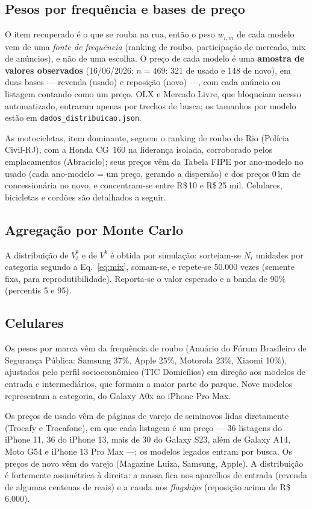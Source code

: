 \documentclass[11pt,a4paper]{article}
\newcommand{\reais}[1]{R\$\,#1}
\begin{document}
\subsection{Pesos por frequência e bases de preço}
O item recuperado é o que se rouba na rua, então o peso $w_{i,m}$ de cada modelo vem de uma
\emph{fonte de frequência} (ranking de roubo, participação de mercado, mix de anúncios), e não de
uma escolha. O preço de cada modelo é uma \textbf{amostra de valores observados} (16/06/2026;
$n=469$: 321 de usado e 148 de novo), em duas bases --- revenda (usado) e reposição (novo) ---, com
cada anúncio ou listagem contando como um preço. OLX e Mercado Livre, que bloqueiam acesso
automatizado, entraram apenas por trechos de busca; os tamanhos por modelo estão em
\texttt{dados\_distribuicao.json}.

As motocicletas, item dominante, seguem o ranking de roubo do Rio (Polícia Civil-RJ), com a Honda
CG~160 na liderança isolada, corroborado pelos emplacamentos (Abraciclo); seus preços vêm da Tabela
FIPE por ano-modelo no usado (cada ano-modelo = um preço, gerando a dispersão) e dos preços
0\,km de concessionária no novo, e concentram-se entre \reais{10} e \reais{25} mil. Celulares,
bicicletas e cordões são detalhados a seguir.

\subsection{Agregação por Monte Carlo}\label{sec:mc}
A distribuição de $V_i^b$ e de $V^b$ é obtida por simulação: sorteiam-se $N_i$ unidades por
categoria segundo a Eq.~\eqref{eq:mix}, somam-se, e repete-se 50.000 vezes (semente fixa, para
reprodutibilidade). Reporta-se o valor esperado e a banda de 90\% (percentis 5 e 95).

\subsection{Celulares}
Os pesos por marca vêm da frequência de roubo (Anuário do Fórum Brasileiro de Segurança Pública:
Samsung 37\%, Apple 25\%, Motorola 23\%, Xiaomi 10\%), ajustados pelo perfil socioeconômico (TIC
Domicílios) em direção aos modelos de entrada e intermediários, que formam a maior parte do parque.
Nove modelos representam a categoria, do Galaxy A0x ao iPhone Pro Max.

Os preços de usado vêm de páginas de varejo de seminovos lidas diretamente (Trocafy e Trocafone), em
que cada listagem é um preço --- 36 listagens do iPhone 11, 36 do iPhone 13, mais de 30 do Galaxy
S23, além de Galaxy A14, Moto G54 e iPhone 13 Pro Max ---; os modelos legados entram por busca. Os
preços de novo vêm do varejo (Magazine Luiza, Samsung, Apple). A distribuição é fortemente
assimétrica à direita: a massa fica nos aparelhos de entrada (revenda de algumas centenas de reais)
e a cauda nos \emph{flagships} (reposição acima de \reais{6.000}).
\end{document}
